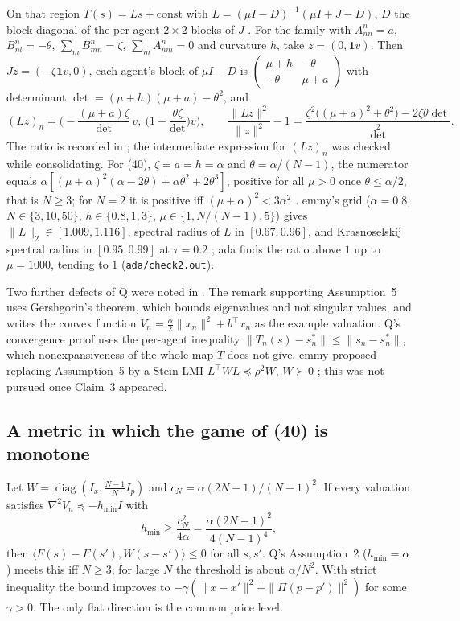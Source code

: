 \documentclass{article}
\begin{document}
On that region \(T(s)=Ls+\text{const}\) with \(L=(\mu I-D)^{-1}(\mu I+J-D)\), \(D\) the block diagonal of the per-agent \(2\times2\) blocks of \(J\) . For the family with \(A^n_{nn}=a\), \(B^n_{nl}=-\theta\), \(\sum_mB^n_{mn}=\zeta\), \(\sum_mA^n_{nm}=0\) and curvature \(h\), take \(z=(0,\mathbf 1v)\). Then \(Jz=(-\zeta\mathbf 1v,0)\), each agent's block of \(\mu I-D\) is \(\begin{pmatrix}\mu+h&-\theta\\-\theta&\mu+a\end{pmatrix}\) with determinant \(\det=(\mu+h)(\mu+a)-\theta^2\), and
\[
(Lz)_n=\Big(-\frac{(\mu+a)\zeta}{\det}\,v,\ \Big(1-\frac{\theta\zeta}{\det}\Big)v\Big),\qquad
\frac{\|Lz\|^2}{\|z\|^2}-1=\frac{\zeta^2\big((\mu+a)^2+\theta^2\big)-2\zeta\theta\det}{\det^2}.
\]
The ratio is recorded in ; the intermediate expression for \((Lz)_n\) was checked while consolidating. For (40), \(\zeta=a=h=\alpha\) and \(\theta=\alpha/(N-1)\), the numerator equals \(\alpha[(\mu+\alpha)^2(\alpha-2\theta)+\alpha\theta^2+2\theta^3]\), positive for all \(\mu>0\) once \(\theta\le\alpha/2\), that is \(N\ge3\); for \(N=2\) it is positive iff \((\mu+\alpha)^2<3\alpha^2\) . emmy's grid (\(\alpha=0.8\), \(N\in\{3,10,50\}\), \(h\in\{0.8,1,3\}\), \(\mu\in\{1,N/(N-1),5\}\)) gives \(\|L\|_2\in[1.009,1.116]\), spectral radius of \(L\) in \([0.67,0.96]\), and Krasnoselskij spectral radius in \([0.95,0.99]\) at \(\tau=0.2\) ; ada finds the ratio above \(1\) up to \(\mu=1000\), tending to \(1\)  (\texttt{ada/check2.out}).

Two further defects of Q were noted in . The remark supporting Assumption~5 uses Gershgorin's theorem, which bounds eigenvalues and not singular values, and writes the convex function \(V_n=\tfrac{\alpha}{2}\|x_n\|^2+b^\top x_n\) as the example valuation. Q's convergence proof uses the per-agent inequality \(\|T_n(s)-s_n^\ast\|\le\|s_n-s_n^\ast\|\), which nonexpansiveness of the whole map \(T\) does not give. emmy proposed replacing Assumption~5 by a Stein LMI \(L^\top WL\preceq\rho^2W\), \(W\succ0\) ; this was not pursued once Claim~3 appeared.

\subsection{A metric in which the game of (40) is monotone}

\begin{claim}
Let \(W=\operatorname{diag}(I_x,\tfrac{N-1}{N}I_p)\) and \(c_N=\alpha(2N-1)/(N-1)^2\). If every valuation satisfies \(\nabla^2V_n\preceq-h_{\min}I\) with
\[
h_{\min}\ge\frac{c_N^2}{4\alpha}=\frac{\alpha(2N-1)^2}{4(N-1)^4},
\]
then \(\langle F(s)-F(s'),W(s-s')\rangle\le0\) for all \(s,s'\). Q's Assumption~2 (\(h_{\min}=\alpha\)) meets this iff \(N\ge3\); for large \(N\) the threshold is about \(\alpha/N^2\). With strict inequality the bound improves to \(-\gamma(\|x-x'\|^2+\|\Pi(p-p')\|^2)\) for some \(\gamma>0\). The only flat direction is the common price level. 
\end{claim}
\end{document}
